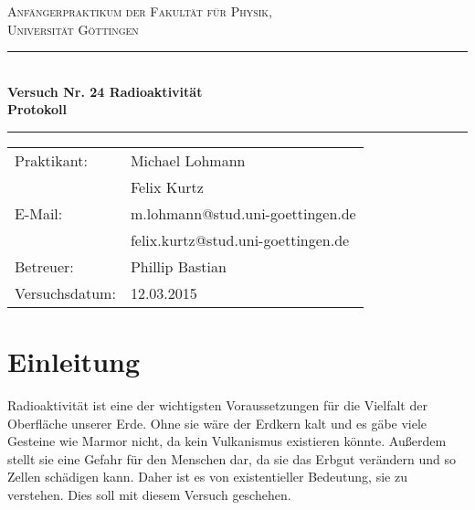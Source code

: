 \documentclass[12pt,a4paper,titlepage,headinclude,bibtotoc]{scrartcl}
\begin{document}
\begin{titlepage}
\centering
\textsc{\Large Anfängerpraktikum der Fakultät für
  Physik,\\[1.5ex] Universität Göttingen}

\vspace*{3cm}

\rule{\textwidth}{1pt}\\[0.5cm]
{\huge \bfseries
  Versuch Nr. 24 Radioaktivität\\[1.5ex]
  Protokoll}\\[0.5cm]
\rule{\textwidth}{1pt}

\vspace*{3cm}

\begin{Large}
\begin{tabular}{ll}
Praktikant: &  Michael Lohmann\\
 &  Felix Kurtz\\
 E-Mail: & m.lohmann@stud.uni-goettingen.de\\
 &  felix.kurtz@stud.uni-goettingen.de\\
 Betreuer: & Phillip Bastian\\
 Versuchsdatum: & 12.03.2015\\
\end{tabular}
\end{Large}

\vspace*{0.8cm}

\begin{Large}
\end{Large}

\end{titlepage}

\tableofcontents

\newpage

\section{Einleitung}
\label{sec:einleitung}
Radioaktivität ist eine der wichtigsten Voraussetzungen für die Vielfalt der Oberfläche unserer Erde.
Ohne sie wäre der Erdkern kalt und es gäbe viele Gesteine wie Marmor nicht, da kein Vulkanismus existieren könnte.
Außerdem stellt sie eine Gefahr für den Menschen dar, da sie das Erbgut verändern und so Zellen schädigen kann.
Daher ist es von existentieller Bedeutung, sie zu verstehen.
Dies soll mit diesem Versuch geschehen.
\cite{lp24}
 
\end{document}

